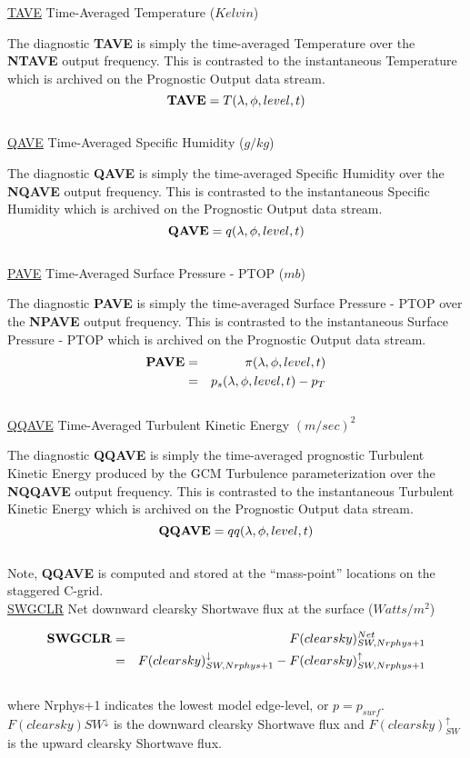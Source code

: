\noindent
{ \underline {TAVE} Time-Averaged Temperature ($Kelvin$) }

\noindent
The diagnostic {\bf TAVE} is simply the time-averaged Temperature over
the {\bf NTAVE} output frequency.  This is contrasted to the instantaneous
Temperature which is archived on the Prognostic Output data stream.
\[
{\bf TAVE} = T(\lambda, \phi, level , t)
\]
\\

\noindent
{ \underline {QAVE} Time-Averaged Specific Humidity ($g/kg$) }

\noindent
The diagnostic {\bf QAVE} is simply the time-averaged Specific Humidity over
the {\bf NQAVE} output frequency.  This is contrasted to the instantaneous
Specific Humidity which is archived on the Prognostic Output data stream.
\[
{\bf QAVE} = q(\lambda, \phi, level , t)
\]
\\

\noindent
{ \underline {PAVE} Time-Averaged Surface Pressure - PTOP ($mb$) }

\noindent
The diagnostic {\bf PAVE} is simply the time-averaged Surface Pressure - PTOP over
the {\bf NPAVE} output frequency.  This is contrasted to the instantaneous
Surface Pressure - PTOP which is archived on the Prognostic Output data stream.
\begin{eqnarray*}
{\bf PAVE} & =  & \pi(\lambda, \phi, level , t) \\
           & =  & p_s(\lambda, \phi, level , t) - p_T
\end{eqnarray*}
\\

 
\noindent
{ \underline {QQAVE} Time-Averaged Turbulent Kinetic Energy $(m/sec)^2$ }
 
\noindent
The diagnostic {\bf QQAVE} is simply the time-averaged prognostic Turbulent Kinetic Energy 
produced by the GCM Turbulence parameterization over
the {\bf NQQAVE} output frequency.  This is contrasted to the instantaneous
Turbulent Kinetic Energy which is archived on the Prognostic Output data stream.
\[
{\bf QQAVE} = qq(\lambda, \phi, level , t)
\]
\\
Note, {\bf QQAVE} is computed and stored at the ``mass-point'' locations on the staggered C-grid.
\\
 
\noindent
{ \underline {SWGCLR} Net downward clearsky Shortwave flux at the surface ($Watts/m^2$) }

\noindent
\begin{eqnarray*}
{\bf SWGCLR} & =  & F(clearsky)_{SW,Nrphys+1}^{Net} \\
             & =  & F(clearsky)_{SW,Nrphys+1}^\downarrow - F(clearsky)_{SW,Nrphys+1}^\uparrow
\end{eqnarray*}
\noindent
\\
where Nrphys+1 indicates the lowest model edge-level, or $p = p_{surf}$.
$F(clearsky){SW}^\downarrow$ is
the downward clearsky Shortwave flux and $F(clearsky)_{SW}^\uparrow$ is 
the upward clearsky Shortwave flux.
\\

